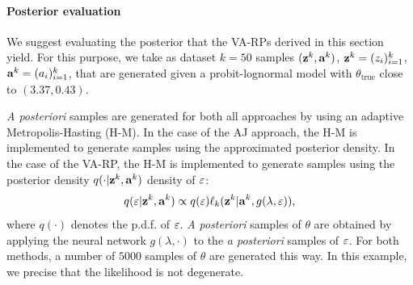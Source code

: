 
\paragraph{Posterior evaluation}
We suggest evaluating the posterior that the VA-RPs derived in this section yield.
For this purpose, we take as dataset $k=50$ samples $(\mathbf{z}^k,\mathbf{a}^k)$, $\mathbf{z}^k=(z_i)_{i=1}^k$, $\mathbf{a}^k=(a_i)_{i=1}^k$, that are generated given a probit-lognormal model with $\theta_{\text{true}}$ close to $(3.37, 0.43)$. %

\emph{A posteriori} samples are generated for both all approaches by using an adaptive Metropolis-Hasting (H-M).
In the case of the AJ approach, the H-M is implemented to generate samples using the approximated posterior density.
In the case of the VA-RP, the H-M is implemented to generate samples using the posterior density $q(\cdot|\mathbf{z}^k,\mathbf{a}^k)$ density of $\varepsilon$:
    \begin{equation}
        q(\varepsilon|\mathbf{z}^k,\mathbf{a}^k) \propto q(\varepsilon)\ell_k(\mathbf{z}^k|\mathbf{a}^k,g(\lambda,\varepsilon)),
    \end{equation}
where $q(\cdot)$ denotes the p.d.f. of $\varepsilon$.
\emph{A posteriori} samples of $\theta$ are obtained by applying the neural network $g(\lambda,\cdot)$ to the \emph{a posteriori} samples of $\varepsilon$.
For both methods, a number of $5000$ samples of $\theta$ are generated this way.
In this example, 
we precise that the likelihood is not degenerate.





